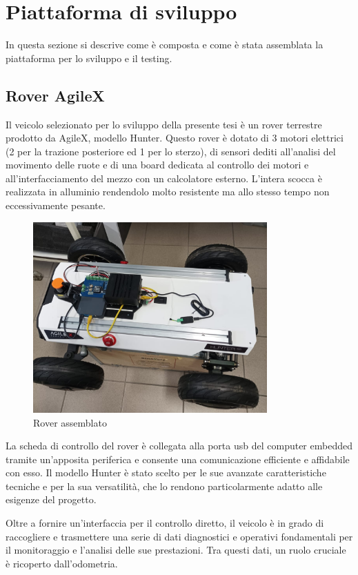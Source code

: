 \section{Piattaforma di sviluppo}
In questa sezione si descrive come è composta e come è stata assemblata la piattaforma per lo sviluppo e il testing.

\subsection{Rover AgileX}
Il veicolo selezionato per lo sviluppo della presente tesi è un rover terrestre prodotto da AgileX, modello Hunter. Questo rover è dotato di 3 motori elettrici (2 per la trazione posteriore ed 1 per lo sterzo), di sensori dediti all'analisi del movimento delle ruote e di una board dedicata al controllo dei motori e all'interfacciamento del mezzo con un calcolatore esterno. L'intera scocca è realizzata in alluminio rendendolo molto resistente ma allo stesso tempo non eccessivamente pesante.

\begin{figure}[H]
  \centering
  \includegraphics[width=0.8\textwidth]{figures/franco.png}
  \caption{Rover assemblato}
  \label{Rover assemblato}
\end{figure}

\noindent La scheda di controllo del rover è collegata alla porta usb del computer embedded tramite un'apposita periferica e consente una comunicazione efficiente e affidabile con esso. Il modello Hunter è stato scelto per le sue avanzate caratteristiche tecniche e per la sua versatilità, che lo rendono particolarmente adatto alle esigenze del progetto.

\noindent Oltre a fornire un'interfaccia per il controllo diretto, il veicolo è in grado di raccogliere e trasmettere una serie di dati diagnostici e operativi fondamentali per il monitoraggio e l'analisi delle sue prestazioni. Tra questi dati, un ruolo cruciale è ricoperto dall'odometria. 

